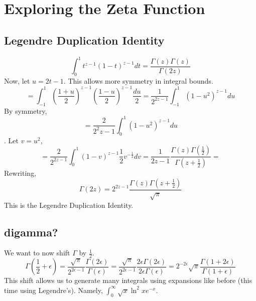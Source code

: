 \documentclass[../main.tex]{subfiles}
\begin{document}
\chapter{Exploring the Zeta Function}
\section{Legendre Duplication Identity}
    $$\int_{0}^{1}t^{z-1}(1-t)^{z-1}dt=\frac{\Gamma(z)\Gamma(z)}{\Gamma(2z)}$$
    Now, let $u=2t-1$. This allows more symmetry in integral bounds.
    $$=\int_{-1}^{1}\left(\frac{1+u}{2}\right)^{z-1}\left(\frac{1-u}{2}\right)^{z-1}\frac{du}{2}=\frac{1}{2^{2z-1}}\int_{-1}^{1}(1-u^{2})^{z-1}du$$
    By symmetry,
    $$=\frac{2}{2^2z-1}\int_{0}^{1}(1-u^2)^{z-1}du$$.
    Let $v=u^{2}$,
    $$=\frac{2}{2^{2z-1}}\int_{0}^{1}(1-v)^{z-1}\frac{1}{2}v^{-\frac{1}{2}}dv=\frac{1}{2z-1}\frac{\Gamma(z)\Gamma(\frac{1}{2})}{\Gamma(z+\frac{1}{2})}=$$
    Rewriting,
    $$\boxed{\Gamma(2z)=2^{2z-1}\frac{\Gamma(z)\Gamma(z+\frac{1}{2})}{\sqrt{\pi}}}$$
    This is the Legendre Duplication Identity.

\section{digamma?}
    We want to now shift $\Gamma$ by $\frac{1}{2}$.
    $$\Gamma(\frac{1}{2}+\epsilon)=\frac{\sqrt{\pi}}{2^{2\epsilon-1}}\frac{\Gamma(2\epsilon)}{\Gamma(\epsilon)}=\frac{\sqrt{\pi}}{2^{2\epsilon-1}}\frac{2\epsilon\Gamma(2\epsilon)}{2\epsilon\Gamma(\epsilon)}=2^{-2\epsilon}\sqrt{\pi}\frac{\Gamma(1+2\epsilon)}{\Gamma(1+\epsilon)}$$
    This shift allows us to generate many integrals using expansions like before (this time using Legendre's). Namely, $\int_{0}^{\infty}\sqrt{x}\ln^{2}x e^{-x}$. 
\end{document}
